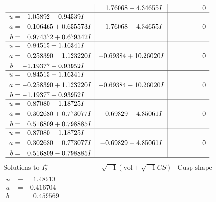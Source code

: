 \documentclass[1p]{elsarticle_modified}
\theoremstyle{definition}
\newcommand{\I}{\sqrt{-1}}
\begin{document}
$$\begin{array}{c|c|c}
 & \phantom{-}1.76068 - 4.34655 I & \phantom{-0.000000 } 0 \\ \hline\begin{aligned}
u &= -1.05892 - 0.94539 I \\
a &= \phantom{-}0.106465 + 0.655573 I \\
b &= \phantom{-}0.974372 + 0.679342 I\end{aligned}
 & \phantom{-}1.76068 + 4.34655 I & \phantom{-0.000000 } 0 \\ \hline\begin{aligned}
u &= \phantom{-}0.84515 + 1.16341 I \\
a &= -0.258390 - 1.123220 I \\
b &= -1.19377 - 0.93952 I\end{aligned}
 & -0.69384 + 10.26020 I & \phantom{-0.000000 } 0 \\ \hline\begin{aligned}
u &= \phantom{-}0.84515 - 1.16341 I \\
a &= -0.258390 + 1.123220 I \\
b &= -1.19377 + 0.93952 I\end{aligned}
 & -0.69384 - 10.26020 I & \phantom{-0.000000 } 0 \\ \hline\begin{aligned}
u &= \phantom{-}0.87080 + 1.18725 I \\
a &= \phantom{-}0.302680 + 0.773077 I \\
b &= \phantom{-}0.516809 + 0.798885 I\end{aligned}
 & -0.69829 + 4.85061 I & \phantom{-0.000000 } 0 \\ \hline\begin{aligned}
u &= \phantom{-}0.87080 - 1.18725 I \\
a &= \phantom{-}0.302680 - 0.773077 I \\
b &= \phantom{-}0.516809 - 0.798885 I\end{aligned}
 & -0.69829 - 4.85061 I & \phantom{-0.000000 } 0\\
 \hline 
 \end{array}$$\newpage$$\begin{array}{c|c|c}  
\text{Solutions to }I^u_{2}& \I (\text{vol} + \sqrt{-1}CS) & \text{Cusp shape}\\
 \hline 
\begin{aligned}
u &= \phantom{-}1.48213\phantom{ +0.000000I} \\
a &= -0.416704\phantom{ +0.000000I} \\
b &= \phantom{-}0.459569\phantom{ +0.000000I}\end{aligned}

\end{array}$$
\end{document}
